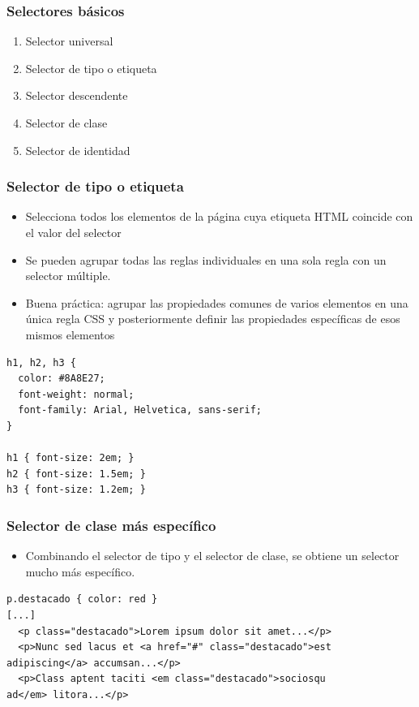 
\begin{frame}
\frametitle{Selectores básicos}

\begin{enumerate}
  \item Selector universal
  \item Selector de tipo o etiqueta
  \item Selector descendente
  \item Selector de clase
  \item Selector de identidad
\end{enumerate}

\end{frame}



\begin{frame}[fragile]
\frametitle{Selector de tipo o etiqueta}

\begin{itemize}
  \item Selecciona todos los elementos de la página cuya etiqueta HTML coincide con el valor del selector
  \item Se pueden agrupar todas las reglas individuales en una sola regla con un selector múltiple.
  \item Buena práctica: agrupar las propiedades comunes de varios elementos en una única regla CSS y posteriormente definir las propiedades específicas de esos mismos elementos
\end{itemize}

{\footnotesize
\begin{verbatim}
h1, h2, h3 {
  color: #8A8E27;
  font-weight: normal;
  font-family: Arial, Helvetica, sans-serif;
}
 
h1 { font-size: 2em; }
h2 { font-size: 1.5em; }
h3 { font-size: 1.2em; }
\end{verbatim}
}

\end{frame}


\begin{frame}[fragile]
\frametitle{Selector de clase más específico}

\begin{itemize}
  \item Combinando el selector de tipo y el selector de clase, se obtiene un selector mucho más específico.
\end{itemize}

{\footnotesize
\begin{verbatim}
p.destacado { color: red }
[...]
  <p class="destacado">Lorem ipsum dolor sit amet...</p>
  <p>Nunc sed lacus et <a href="#" class="destacado">est
adipiscing</a> accumsan...</p>
  <p>Class aptent taciti <em class="destacado">sociosqu
ad</em> litora...</p>
\end{verbatim}
}

\end{frame}


